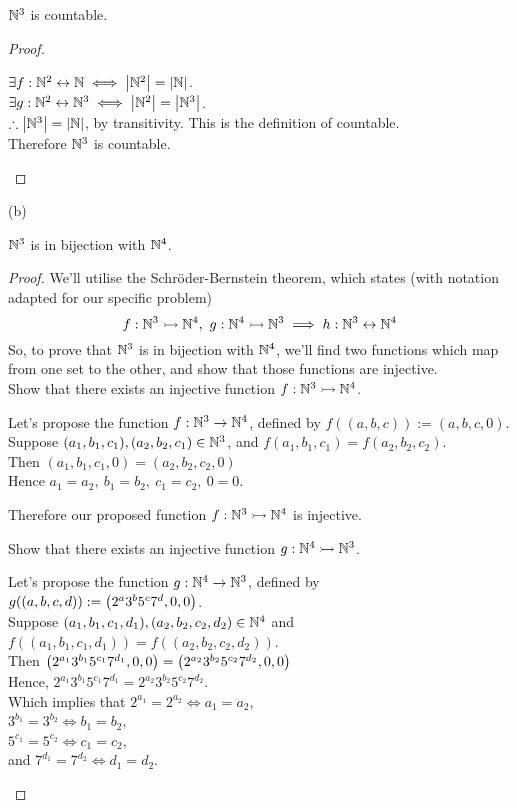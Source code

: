 \documentclass[a4paper, 11pt]{report}
\begin{document}
\Corol $\mathbb{N}^3$ is countable.
\begin{proof}
  \begin{list}{\setlength{\leftmargin}{1in}\setlength{\topsep}{0pt}}\item 
    $\exists f:\mathbb{N}^2\leftrightarrow\mathbb{N}\iff\left| \mathbb{N}^2 \right|=\left| \mathbb{N} \right|$. \\
    $\exists g:\mathbb{N}^2\leftrightarrow\mathbb{N}^3\iff\left| \mathbb{N}^2 \right|=\left| \mathbb{N}^3 \right|$. \\
    $\therefore\left| \mathbb{N}^3 \right|=\left| \mathbb{N} \right|$, by transitivity. This is the definition of countable. \\
    Therefore $\mathbb{N}^3$ is countable.
  \end{list}
\end{proof}

\sol (b)

\Propo $\mathbb{N}^3$ is in bijection with $\mathbb{N}^4$.
\begin{proof}
  We'll utilise the Schr\"oder-Bernstein theorem, which states (with notation adapted for our specific problem)
  $$
    f:\mathbb{N}^3\rightarrowtail\mathbb{N}^4,\ g:\mathbb{N}^4\rightarrowtail\mathbb{N}^3 \implies h:\mathbb{N}^3\leftrightarrow\mathbb{N}^4
  $$
  So, to prove that $\mathbb{N}^3$ is in bijection with $\mathbb{N}^4$, we'll find two functions which map from one set to the other, and show that those functions are injective. \\

  Show that there exists an injective function $f:\mathbb{N}^3\rightarrowtail\mathbb{N}^4$.
  \begin{list}{}{\setlength{\leftmargin}{1in}\setlength{\topsep}{0pt}}\item 
    Let's propose the function $f:\mathbb{N}^3\to\mathbb{N}^4$, defined by $f((a,b,c)) := (a,b,c,0)$. \\
    Suppose $(a_1,b_1,c_1), (a_2,b_2,c_1)\in\mathbb{N}^3$, and $f(a_1,b_1,c_1) = f(a_2,b_2,c_2)$. \\
    Then $(a_1,b_1,c_1,0)=(a_2,b_2,c_2,0)$ \\
    Hence $a_1=a_2,\ b_1=b_2,\ c_1=c_2,\ 0=0$.

    Therefore our proposed function $f:\mathbb{N}^3\rightarrowtail\mathbb{N}^4$ is injective. \\
  \end{list}

  Show that there exists an injective function $g:\mathbb{N}^4\rightarrowtail\mathbb{N}^3$.
  \begin{list}{}{\setlength{\leftmargin}{1in}\setlength{\topsep}{0pt}}\item 
    Let's propose the function $g:\mathbb{N}^4\to\mathbb{N}^3$, defined by $g((a,b,c,d)) := \left( 2^a3^b5^c7^d, 0, 0 \right)$. \\
    Suppose $(a_1,b_1,c_1,d_1), (a_2,b_2,c_2,d_2)\in\mathbb{N}^4$ and $f((a_1,b_1,c_1,d_1)) = f((a_2,b_2,c_2,d_2))$. \\
    Then $\left( 2^{a_1}3^{b_1}5^{c_1}7^{d_1}, 0, 0 \right) = \left( 2^{a_2}3^{b_2}5^{c_2}7^{d_2}, 0, 0 \right)$ \\
    Hence, $2^{a_1}3^{b_1}5^{c_1}7^{d_1}=2^{a_2}3^{b_2}5^{c_2}7^{d_2}$. \\
    Which implies that $2^{a_1}=2^{a_2}\iff a_1=a_2$, \\
    $3^{b_1}=3^{b_2}\iff b_1=b_2$, \\
    $5^{c_1}=5^{c_2}\iff c_1=c_2$, \\
    and $7^{d_1}=7^{d_2}\iff d_1=d_2$. 


\end{list}
\end{proof}
\end{document}
